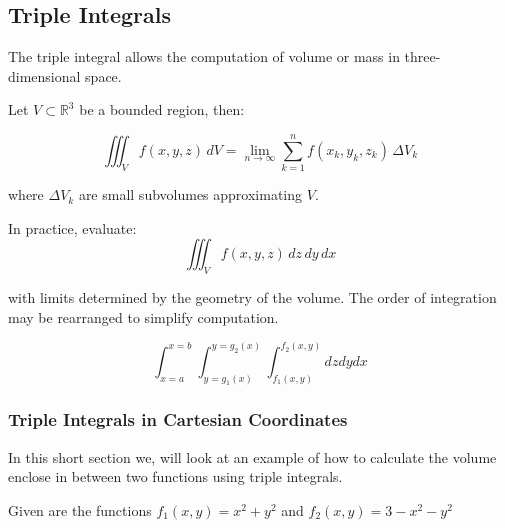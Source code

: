 \QED

\subsection{Triple Integrals}

The triple integral allows the computation of volume or mass in three-dimensional space.

Let \( V \subset \mathbb{R}^3 \) be a bounded region, then:

\[
\iiint_V f(x, y, z)\, dV = \lim_{n \to \infty} \sum_{k=1}^n f(x_k, y_k, z_k) \, \Delta V_k
\]

where \( \Delta V_k \) are small subvolumes approximating \( V \).

In practice, evaluate:
\[
\iiint_V f(x, y, z)\, dz\, dy\, dx
\]

with limits determined by the geometry of the volume. The order of integration may be rearranged to simplify computation.

\[
\int_{x=a}^{x=b}\int_{y=g_1(x)}^{y=g_2(x)} \int_{f_1(x,y)}^{f_2(x,y)} dzdydx
\]

\subsubsection{Triple Integrals in Cartesian Coordinates}

In this short section we, will look at an example of how to calculate the volume enclose in
between two functions using triple integrals.

Given are the functions \(f_1(x,y) = x^2 + y^2\) and \(f_2(x,y) = 3 - x^2 - y^2\)

\newpage
\begin{center}
    
\end{center}

